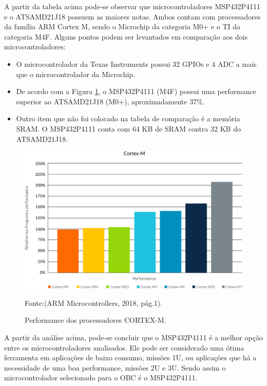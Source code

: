 A partir da tabela acima pode-se observar que microcontroladores MSP432P4111 e o ATSAMD21J18 possuem as maiores notas. Ambos contam com processadores da família ARM Cortex M, sendo o Microchip da categoria M0+ e o TI da categoria M4F. Alguns pontos podem ser levantados em comparação aos dois microcontroladores:

\begin{itemize}
\item O microcontrolador da Texas Instruments possui 32 GPIOs e 4 ADC a mais que o microcontrolador da Microchip.

\item De acordo com a Figura \ref{fig18}, o MSP432P4111 (M4F) possui uma performance superior ao ATSAMD21J18 (M0+), aproximadamente 37\%.

\item Outro item que não foi colocado na tabela de comparação é a memória SRAM. O MSP432P4111 conta com 64 KB de SRAM contra 32 KB do ATSAMD21J18.

\end{itemize}


\begin{figure}[h]

    \centering
    \caption{ Performance dos processadores CORTEX-M.}
	\includegraphics[keepaspectratio=true,scale=0.4]{figuras/arm-cortex-m-series-performance-graph.jpg}
	
	Fonte:(ARM Microcontrollers, 2018, pág.1).
	
	\label{fig18}
\end{figure}

A partir da análise acima, pode-se concluir que o MSP432P4111 é a melhor opção entre os microcontroladores analisados. Ele pode ser considerado uma ótima ferramenta em aplicações de baixo consumo, missões 1U, ou aplicações que há a necessidade de uma boa performance, missões 2U e 3U. Sendo assim o microcontrolador selecionado para o OBC é o MSP432P4111.


